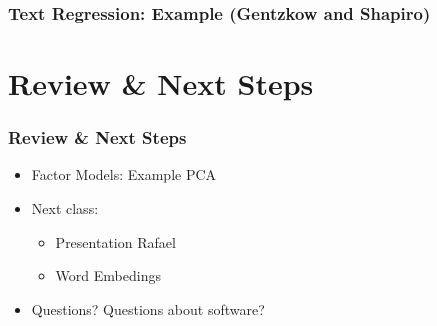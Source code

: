 \documentclass[
  shownotes,
  xcolor={svgnames},
  hyperref={colorlinks,citecolor=DarkBlue,linkcolor=DarkRed,urlcolor=DarkBlue}
  , aspectratio=169]{beamer}
\begin{document}
\begin{frame}[fragile]
\frametitle{Text Regression: Example (Gentzkow and Shapiro)}

\begin{figure}%
    \centering
    \qquad
\end{figure}

\end{frame}

\section{Review
 \& Next Steps}
\begin{frame}
\frametitle{Review \& Next Steps}
  
\begin{itemize} 
  

\medskip
\item Factor Models: Example PCA
    \bigskip  
  \item  Next class:  
  \begin{itemize}
  \item Presentation Rafael
    \medskip
    \item Word Embedings
  \end{itemize}


\bigskip  
\item Questions? Questions about software? 

\end{itemize}
\end{frame}
\end{document}
